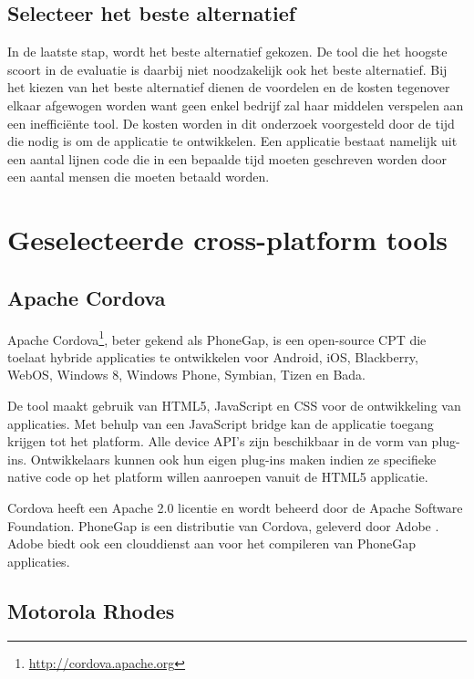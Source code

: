 \documentclass[a4paper]{IEEEconf}
\begin{document}
\subsection{Selecteer het beste alternatief}

In de laatste stap, wordt het beste alternatief gekozen. De tool die het hoogste scoort in de evaluatie is daarbij niet noodzakelijk ook het beste alternatief. Bij het kiezen van het beste alternatief dienen de voordelen en de kosten tegenover elkaar afgewogen worden want geen enkel bedrijf zal haar middelen verspelen aan een ineffici\"ente tool. De kosten worden in dit onderzoek voorgesteld door de tijd die nodig is om de applicatie te ontwikkelen. Een applicatie bestaat namelijk uit een aantal lijnen code die in een bepaalde tijd moeten geschreven worden door een aantal mensen die moeten betaald worden.

\section{Geselecteerde cross-platform tools}

\subsection{Apache Cordova}

Apache Cordova\footnote{\url{http://cordova.apache.org}}, beter gekend als PhoneGap, is een open-source CPT die toelaat hybride applicaties te ontwikkelen voor Android, iOS, Blackberry, WebOS, Windows 8, Windows Phone, Symbian, Tizen en Bada.

De tool maakt gebruik van HTML5, JavaScript en CSS voor de ontwikkeling van applicaties. Met behulp van een JavaScript bridge kan de applicatie toegang krijgen tot het platform. Alle device API's zijn beschikbaar in de vorm van plug-ins. Ontwikkelaars kunnen ook hun eigen plug-ins maken indien ze specifieke native code op het platform willen aanroepen vanuit de HTML5 applicatie.

Cordova heeft een Apache 2.0 licentie en wordt beheerd door de Apache Software Foundation. PhoneGap is een distributie van Cordova, geleverd door Adobe \cite{LeRoux:2012}. Adobe biedt ook een clouddienst aan voor het compileren van PhoneGap applicaties. 

\subsection{Motorola Rhodes}
\end{document}
